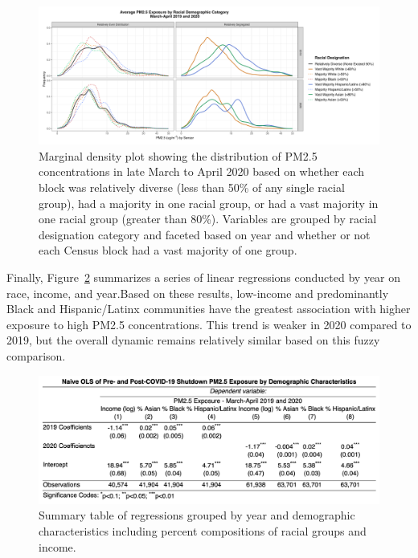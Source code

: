 \documentclass[12pt, ]{article}
\begin{document}
\begin{figure}[H]

{\centering \includegraphics{figures/RaceDsgGroup_MargDensPlot_19v20+SegvDiv.png}

}

\caption{\label{fig-dp}Marginal density plot showing the distribution of
PM2.5 concentrations in late March to April 2020 based on whether each
block was relatively diverse (less than 50\% of any single racial
group), had a majority in one racial group, or had a vast majority in
one racial group (greater than 80\%). Variables are grouped by racial
designation category and faceted based on year and whether or not each
Census block had a vast majority of one group.}

\end{figure}

Finally, Figure~\ref{fig-reg-table} summarizes a series of linear
regressions conducted by year on race, income, and year.Based on these
results, low-income and predominantly Black and Hispanic/Latinx
communities have the greatest association with higher exposure to high
PM2.5 concentrations. This trend is weaker in 2020 compared to 2019, but
the overall dynamic remains relatively similar based on this fuzzy
comparison.

\begin{figure}[H]

{\centering \includegraphics{figures/PM_fits_white.png}

}

\caption{\label{fig-reg-table}Summary table of regressions grouped by
year and demographic characteristics including percent compositions of
racial groups and income.}

\end{figure}
\end{document}
